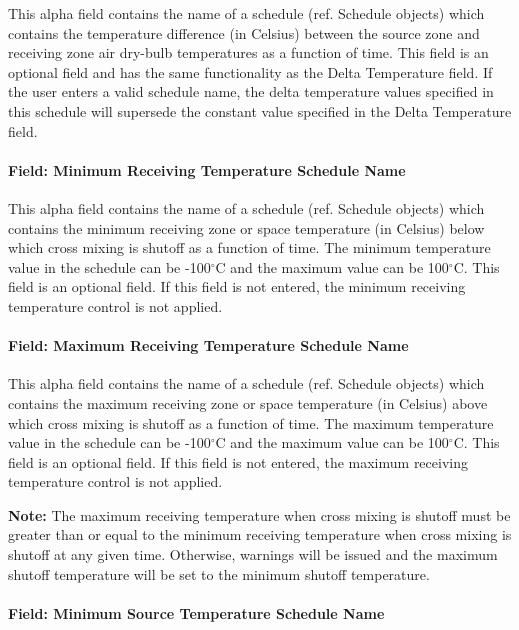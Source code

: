 This alpha field contains the name of a schedule (ref. Schedule objects) which contains the temperature difference (in Celsius) between the source zone and receiving zone air dry-bulb temperatures as a function of time. This field is an optional field and has the same functionality as the Delta Temperature field. If the user enters a valid schedule name, the delta temperature values specified in this schedule will supersede the constant value specified in the Delta Temperature field.

\paragraph{Field: Minimum Receiving Temperature Schedule Name}\label{field-minimum-zone-temperature-schedule-name-1}

This alpha field contains the name of a schedule (ref. Schedule objects) which contains the minimum receiving zone or space temperature (in Celsius) below which cross mixing is shutoff as a function of time. The minimum temperature value in the schedule can be -100$^\circ$C and the maximum value can be 100$^\circ$C. This field is an optional field. If this field is not entered, the minimum receiving temperature control is not applied.

\paragraph{Field: Maximum Receiving Temperature Schedule Name}\label{field-maximum-zone-temperature-schedule-name-1}

This alpha field contains the name of a schedule (ref. Schedule objects) which contains the maximum receiving zone or space temperature (in Celsius) above which cross mixing is shutoff as a function of time. The maximum temperature value in the schedule can be -100$^\circ$C and the maximum value can be 100$^\circ$C. This field is an optional field. If this field is not entered, the maximum receiving temperature control is not applied.

\textbf{Note:} The maximum receiving temperature when cross mixing is shutoff must be greater than or equal to the minimum receiving temperature when cross mixing is shutoff at any given time. Otherwise, warnings will be issued and the maximum shutoff temperature will be set to the minimum shutoff temperature.

\paragraph{Field: Minimum Source Temperature Schedule Name}\label{field-minimum-source-zone-temperature-schedule-name-1}

